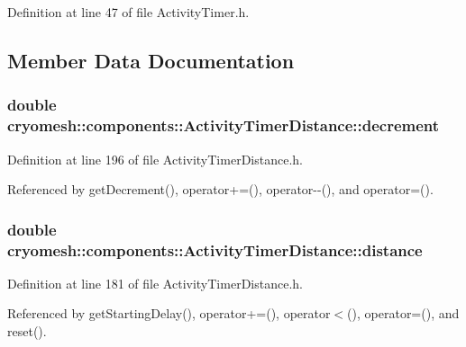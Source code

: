 \-Definition at line 47 of file \-Activity\-Timer.\-h.



\subsection{\-Member \-Data \-Documentation}
\hypertarget{classcryomesh_1_1components_1_1ActivityTimerDistance_a81f6c8dffa1dbe89e7e3d67603f84b9a}{
\subsubsection[{decrement}]{\setlength{\rightskip}{0pt plus 5cm}double {\bf cryomesh\-::components\-::\-Activity\-Timer\-Distance\-::decrement}}}\label{classcryomesh_1_1components_1_1ActivityTimerDistance_a81f6c8dffa1dbe89e7e3d67603f84b9a}


\-Definition at line 196 of file \-Activity\-Timer\-Distance.\-h.



\-Referenced by get\-Decrement(), operator+=(), operator-\/-\/(), and operator=().

\hypertarget{classcryomesh_1_1components_1_1ActivityTimerDistance_a191b202e783b14973aa327c460cdc46e}{
\subsubsection[{distance}]{\setlength{\rightskip}{0pt plus 5cm}double {\bf cryomesh\-::components\-::\-Activity\-Timer\-Distance\-::distance}}}\label{classcryomesh_1_1components_1_1ActivityTimerDistance_a191b202e783b14973aa327c460cdc46e}


\-Definition at line 181 of file \-Activity\-Timer\-Distance.\-h.



\-Referenced by get\-Starting\-Delay(), operator+=(), operator$<$(), operator=(), and reset().

